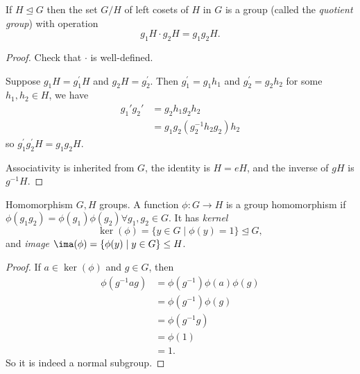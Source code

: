 \begin{proposition}{}{}
    If \(H \trianglelefteq G\) then the set \(G / H\) of left cosets of \(H\) in \(G\) is a group (called the \textit{quotient group}) with operation
\[
    g_1 H \cdot g_2 H = g_1 g_2 H.
\]
\end{proposition}
\begin{proof}
Check that \(\cdot\) is well-defined.

Suppose \(g_1 H = g_1 ^\prime H\) and \(g_2 H = g_2 ^\prime\). Then \(g_1 ^\prime =g_1 h_1\) and \(g_2 ^\prime  = g_2 h_2\) for some \(h_1, h_2 \in H\), we have
\begin{align*}
    g_1' g_2' &= g_2h_1g_2h_2\\
    &=g_1 g_2 (g_2^{-1}h_2 g_2)h_2
\end{align*}
so \(g_1 ^\prime g_2 ^\prime  H = g_1 g_2 H\).

Associativity is inherited from \(G\), the identity is \(H = e H\), and the inverse of \(g H\) is \(g^{-1} H\).
\end{proof}

\begin{definition}{Homomorphism}{}
    \(G, H\) groups. A function \(\phi: G \to H\) is a group homomorphism if \(\phi(g_1 g_2) = \phi(g_1)\phi(g_2) \forall g_1, g_2 \in G\). It has \textit{kernel}
\[
    \ker(\phi) = \{y \in G \mid \phi(y) = 1\} \trianglelefteq G,
\]
and \textit{image} \(\ima(\phi)= \{\phi(y)\mid y\in G\} \leq H\).
\end{definition}

\begin{proof}
If \(a \in \ker(\phi)\) and \(g \in G\), then
\begin{align*}
    \phi(g^{-1}ag) &= \phi(g^{-1})\phi(a)\phi(g)\\
    &= \phi(g^{-1}) \phi(g)\\
    &= \phi(g^{-1}g)\\
    &= \phi(1)\\
    &= 1.
\end{align*}
So it is indeed a normal subgroup.
\end{proof}